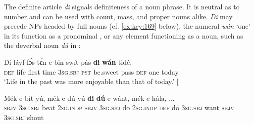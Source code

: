 \begin{table}
\caption{Characteristics of definiteness marking}
\label{tab:key:5.1}
\end{table}
The definite article \textit{di} signals definiteness of a noun phrase. It is neutral as to number and can be used with count, mass, and proper nouns alike. \textit{Di} may precede NPs headed by full nouns (cf. \ref{ex:key:169} below), the numeral \textit{wán} ‘one’ in its function as a pronominal , or any element functioning as a noun, such as the deverbal noun \textit{dú} in \textsc{:} 


\ea%
    \label{ex:key:165}
    \gll Di  láyf  fɔ́s  tɛ́n    e    bin  swít    pás    \textbf{di}  \textbf{wán}    tidé.\\
\textsc{def}  life  first  time    \textsc{3sg.sbj}  \textsc{pst}  be.sweet  pass    \textsc{def}  one    today\\

\glt ‘Life in the past was more enjoyable than that of today.’ [\textstylePichiexamplenumberZchnZchn{ab03ay 104]}
\z


\ea%
    \label{ex:key:166}
    \gll Mék    e    bít    yú,    mék    e    dú  yú    \textbf{di}  \textbf{dú} e    wánt,  mék    e    hála,  \op...\cp\\
\textsc{sbjv}    \textsc{3sg.sbj}  beat    \textsc{2sg.indp}  \textsc{sbjv}    \textsc{3sg.sbj}  do  \textsc{2sg.indp}  \textsc{def}  do
\textsc{3sg.sbj}  want  \textsc{sbjv}    \textsc{3sg.sbj}  shout\\

